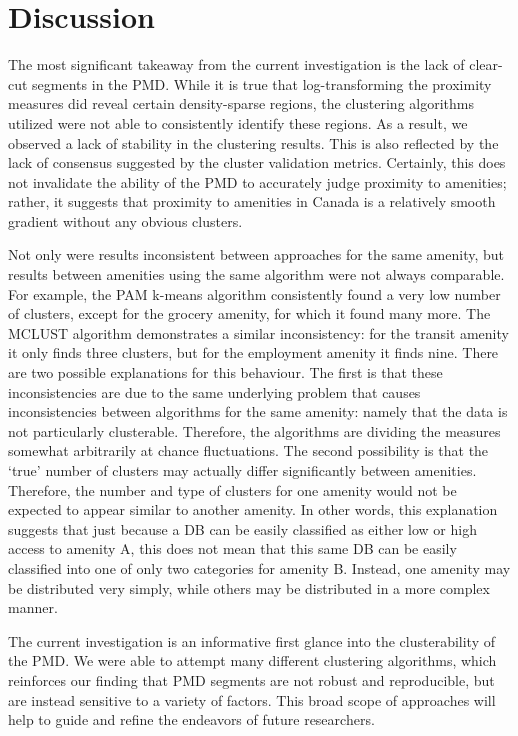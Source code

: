\documentclass[11pt, a4paper]{article}
\begin{document}
\pagebreak
\section{Discussion}


The most significant takeaway from the current investigation is the lack of clear-cut segments in the PMD. While it is true that log-transforming the proximity measures did reveal certain density-sparse regions, the clustering algorithms utilized were not able to consistently identify these regions. As a result, we observed a lack of stability in the clustering results. This is also reflected by the lack of consensus suggested by the cluster validation metrics. Certainly, this does not invalidate the ability of the PMD to accurately judge proximity to amenities; rather, it suggests that proximity to amenities in Canada is a relatively smooth gradient without any obvious clusters.
\par
Not only were results inconsistent between approaches for the same amenity, but results between amenities using the same algorithm were not always comparable. For example, the PAM k-means algorithm consistently found a very low number of clusters, except for the grocery amenity, for which it found many more. The MCLUST algorithm demonstrates a similar inconsistency: for the transit amenity it only finds three clusters, but for the employment amenity it finds nine. There are two possible explanations for this behaviour. The first is that these inconsistencies are due to the same underlying problem that causes inconsistencies between algorithms for the same amenity: namely that the data is not particularly clusterable. Therefore, the algorithms are dividing the measures somewhat arbitrarily at chance fluctuations. The second possibility is that the `true' number of clusters may actually differ significantly between amenities. Therefore, the number and type of clusters for one amenity would not be expected to appear similar to another amenity. In other words, this explanation suggests that just because a DB can be easily classified as either low or high access to amenity A, this does not mean that this same DB can be easily classified into one of only two categories for amenity B. Instead, one amenity may be distributed very simply, while others may be distributed in a more complex manner.
\par
The current investigation is an informative first glance into the clusterability of the PMD. We were able to attempt many different clustering algorithms, which reinforces our finding that PMD segments are not robust and reproducible, but are instead sensitive to a variety of factors. This broad scope of approaches will help to guide and refine the endeavors of future researchers.
\end{document}
